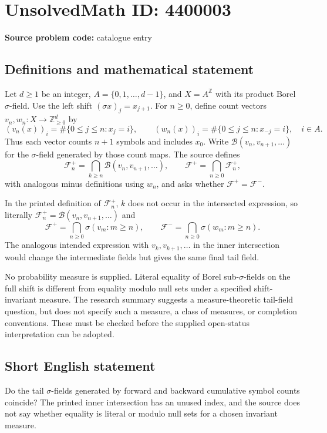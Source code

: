 \documentclass[11pt]{article}
\newcommand{\Z}{\mathbb{Z}}
\begin{document}
\section*{UnsolvedMath ID: 4400003}
\textbf{Source problem code:} catalogue entry
\subsection{Definitions and mathematical statement}
Let $d\geq1$ be an integer, $A=\{0,1,\ldots,d-1\}$, and $X=A^{\Z}$ with its product Borel $\sigma$-field. Use the left shift $(\sigma x)_j=x_{j+1}$. For $n\geq0$, define count vectors $v_n,w_n:X\to\Z_{\geq0}^d$ by
\[
(v_n(x))_i=\#\{0\leq j\leq n:x_j=i\},\qquad
(w_n(x))_i=\#\{0\leq j\leq n:x_{-j}=i\},\quad i\in A.
\]
Thus each vector counts $n+1$ symbols and includes $x_0$. Write $\mathcal B(v_n,v_{n+1},\ldots)$ for the $\sigma$-field generated by those count maps. The source defines
\[
\mathcal F_n^+=\bigcap_{k\geq n}\mathcal B(v_n,v_{n+1},\ldots),\qquad
\mathcal F^+=\bigcap_{n\geq0}\mathcal F_n^+,
\]
with analogous minus definitions using $w_n$, and asks whether $\mathcal F^+=\mathcal F^-$.

In the printed definition of $\mathcal F_n^+$, $k$ does not occur in the intersected expression, so literally $\mathcal F_n^+=\mathcal B(v_n,v_{n+1},\ldots)$ and
\[
\mathcal F^+=\bigcap_{n\geq0}\sigma(v_m:m\geq n),\qquad
\mathcal F^-=\bigcap_{n\geq0}\sigma(w_m:m\geq n).
\]
The analogous intended expression with $v_k,v_{k+1},\ldots$ in the inner intersection would change the intermediate fields but gives the same final tail field.

No probability measure is supplied. Literal equality of Borel sub-$\sigma$-fields on the full shift is different from equality modulo null sets under a specified shift-invariant measure. The research summary suggests a measure-theoretic tail-field question, but does not specify such a measure, a class of measures, or completion conventions. These must be checked before the supplied open-status interpretation can be adopted.
\subsection{Short English statement}
Do the tail $\sigma$-fields generated by forward and backward cumulative symbol counts coincide? The printed inner intersection has an unused index, and the source does not say whether equality is literal or modulo null sets for a chosen invariant measure.
\end{document}
